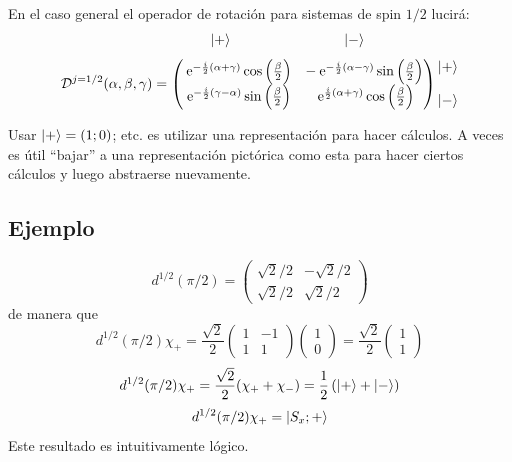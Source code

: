 \documentclass[10pt,oneside]{CBFT_book}
\begin{document}
En el caso general el operador de rotación para sistemas de spin $1/2$ lucirá:
\[
	\begin{matrix} \qquad\qquad \Ket{+} \qquad\qquad\qquad\qquad \Ket{-} \end{matrix}
\]
\[
	\mathcal{D}^{j=1/2} (\alpha,\beta,\gamma) = \begin{pmatrix}
	        \:\mathrm{e}^{-\frac{i}{2}(\alpha + \gamma)} \cos\left(\frac{\beta}{2}\right) & 
			- \:\mathrm{e}^{-\frac{i}{2}(\alpha - \gamma)} \sin\left(\frac{\beta}{2}\right) \\
	        \:\mathrm{e}^{-\frac{i}{2}(\gamma -\alpha )} \sin\left(\frac{\beta}{2}\right) & 
			\:\mathrm{e}^{\frac{i}{2}(\alpha + \gamma)} \cos\left(\frac{\beta}{2}\right)
	       \end{pmatrix} 
	       \begin{matrix} \Ket{+} \\ \\  \Ket{-} \end{matrix}
\]

Usar $\Ket{+}=(1; 0)$; etc. es utilizar una representación para hacer cálculos.
A veces es útil ``bajar'' a una representación pictórica como esta para hacer
ciertos cálculos y luego abstraerse nuevamente.

\subsection{Ejemplo}

\[
	d^{1/2}(\pi/2) = \begin{pmatrix}
	                  \sqrt{2}/2 & -\sqrt{2}/2 \\
	                  \sqrt{2}/2 & \sqrt{2}/2
	                 \end{pmatrix}
\]
de manera que 
\[
	d^{1/2}(\pi/2)\chi_{+} = \frac{\sqrt{2}}{2}\begin{pmatrix} 1 & -1 \\  1 & 1 \end{pmatrix}
	                                           \begin{pmatrix}  1 \\ 0  \end{pmatrix} 
				= \frac{\sqrt{2}}{2} \begin{pmatrix}  1 \\ 1 \end{pmatrix} 
\]
\[
	d^{1/2}(\pi/2)\chi_{+} = \frac{\sqrt{2}}{2} (\chi_+ + \chi_- )  = \frac{1}{2} \left( \Ket{+} + \Ket{-} \right)
\]
\[
	d^{1/2}(\pi/2)\chi_{+} = \Ket{S_x ; + }
\]
Este resultado es intuitivamente lógico.
\end{document}
